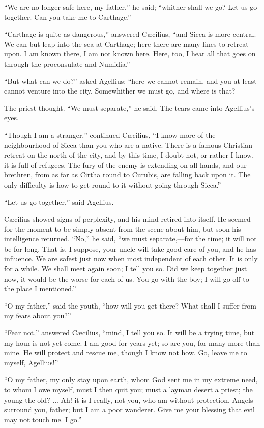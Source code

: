 ``We are no longer safe here, my father,'' he said;
``whither shall we go? Let us go together. Can you take me to
Carthage.''

``Carthage is quite as dangerous,'' answered Cæcilius,
``and Sicca is more central. We can but leap into the sea at
Carthage; here there are many lines to retreat upon. I am known there,
I am not known here. Here, too, I hear all that goes on through the
proconsulate and Numidia.''

``But what can we do?'' asked Agellius; ``here we
cannot remain, and you at least cannot venture into the city.
Somewhither we must go, and where is that?

The priest thought. ``We must separate,'' he said. The
tears came into Agellius's eyes.

``Though I am a stranger,'' continued Cæcilius, ``I
know more of the neighbourhood of Sicca than you who are a native.
There is a famous Christian retreat on the north of the city, and by
this time, I doubt not, or rather I know, it is full of refugees. The
fury of the enemy is extending on all hands, and our brethren, from as
far as Cirtha round to Curubis, are falling back upon it. The only
difficulty is how to get round to it without going through Sicca.''

``Let us go together,'' said Agellius.

Cæcilius showed signs of perplexity, and his mind retired into
itself. He seemed for the moment to be simply absent from the scene
about him, but soon his intelligence returned. ``No,''
he said, ``we must separate,—for the time; it will not be for
long. That is, I suppose, your uncle will take good care of you, and
he has influence. We are safest just now when most independent of each
other. It is only for a while. We shall meet again soon; I tell you
so. Did we keep together just now, it would be the worse for each of
us. You go with the boy; I will go off to the place I mentioned.''

``O my father,'' said the youth, ``how will you get
there? What shall I suffer from my fears about you?''

``Fear not,'' answered Cæcilius, ``mind, I tell you
so. It will be a trying time, but my hour is not yet come. I am good
for years yet; so are you, for many more than mine. He will protect
and rescue me, though I know not how. Go, leave me to myself, Agellius!''

``O my father, my only stay upon earth, whom God sent me in my
extreme need, to whom I owe myself, must I then quit you; must a
layman desert a priest; the young the old? ... Ah! it is I really, not
you, who am without protection. Angels surround you, father; but I am
a poor wanderer. Give me your blessing that evil may not touch me. I
go.''

